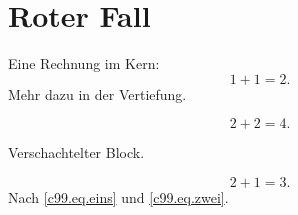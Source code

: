 \chapter{Roter Fall}\label{c99}

Eine Rechnung im Kern:
\begin{equation}\label{c99.eq.eins}
  1 + 1 = 2.
\end{equation}
Mehr dazu in der Vertiefung.

\begin{vertiefung}[id=c99.v1, titel={Tiefer}, wozu={Zeigt eine zweite Rechnung.},
    voraussetzung={Gleichung~\eqref{c99.eq.eins}.}, zurueck={Es bleibt bei zwei.}]
  \begin{equation}\label{c99.eq.tief}
    2 + 2 = 4.
  \end{equation}
  \begin{vertiefung}[id=c99.v2, titel={Noch tiefer}, wozu={Verschachtelt.}, voraussetzung={Keine.}, zurueck={Nichts.}]
    Verschachtelter Block.
  \end{vertiefung}
\end{vertiefung}

\begin{equation}\label{c99.eq.zwei}
  2 + 1 = 3.
\end{equation}
Nach \eqref{c99.eq.eins} und \eqref{c99.eq.zwei}.

